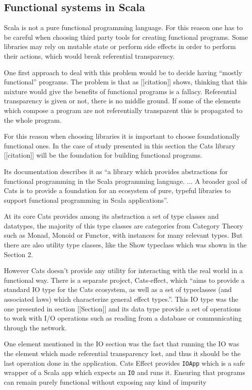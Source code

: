 \documentclass[../main.tex]{subfiles}
\begin{document}
\subsection{Functional systems in Scala}
Scala is not a pure functional programming language. For this reason one has to
be careful when choosing third party tools for creating functional programs.
Some libraries may rely on mutable state or perform side effects in order to
perform their actions, which would break referential transparency.

One first approach to deal with this problem would be to decide having ``mostly
functional'' programs. The problem is that as [[citation]] shows, thinking that
this mixture would give the benefits of functional programs is a
fallacy. Referential transparency is given or not, there is no middle ground. If
some of the elements which compose a program are not referentially transparent
this is propagated to the whole program.

For this reason when choosing libraries it is important to choose foundationally
functional ones. In the case of study presented in this section the Cats library [[citation]]
will be the foundation for building functional programs.

Its documentation describes it as ``a library which provides abstractions for
functional programming in the Scala programming language. ... A broader goal of
Cats is to provide a foundation for an ecosystem of pure, typeful libraries to
support functional programming in Scala applications''.

At its core Cats provides among its abstraction a set of type classes and
datatypes, the majority of this type classes are categories from Category Theory
such as Monad, Monoid or Functor, with instances for many relevant types. But
there are also utility type classes, like the Show typeclass which was shown in
the Section 2.

However Cats doesn't provide any utility for interacting with the real world in
a functional way. There is a separate project, Cats-effect, which ``aims to
provide a standard IO type for the Cats ecosystem, as well as a set
of typeclasses (and associated laws) which characterize general effect types.''.
This IO type was the one presented in section [[Section]] and its data type
provide a set of operations to work with I/O operations such as reading from a
database or communicating through the network.

One element mentioned in the IO section was the fact that running the IO was the
element which made referential transparency lost, and thus it should be the last
operation done in the application. Cats Effect provides \texttt{IOApp} which is
a safe wrapper of a Scala app which expects an \texttt{IO} and runs it. Ensuring
that programs can remain purely functional without exposing any kind of impurity
\end{document}
